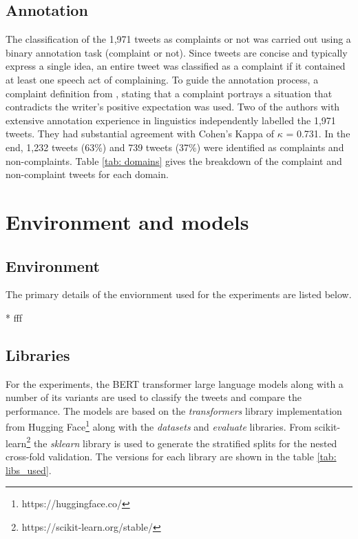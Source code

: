 \subsection{Annotation}
The classification of the 1,971 tweets as complaints or not was carried out using a binary annotation task (complaint or not). Since tweets are concise and typically express a single idea, an entire tweet was classified as a complaint if it contained at least one speech act of complaining. To guide the annotation process, a complaint definition from \cite{olshtain_speechact_1987}, stating that a complaint portrays a situation that contradicts the writer's positive expectation was used. Two of the authors with extensive annotation experience in linguistics independently labelled the 1,971 tweets. They had substantial agreement \cite{artsteinInterCoderAgreementComputational2008} with Cohen's Kappa of $\kappa$ = 0.731. In the end, 1,232 tweets (63\%) and 739 tweets (37\%) were identified as complaints and non-complaints. Table \ref{tab: domains} gives the breakdown of the complaint and non-complaint tweets for each domain.

\section{Environment and models}

\subsection{Environment}
The primary details of the enviornment used for the experiments are listed below. 

* fff

\subsection{Libraries}
For the experiments, the BERT transformer large language models along with a number of its variants are used to classify the tweets and compare the performance. The models are based on the \textit{transformers} library implementation from Hugging Face\footnote{https://huggingface.co/} along with the \textit{datasets} and \textit{evaluate} libraries. From scikit-learn\footnote{https://scikit-learn.org/stable/} the \textit{sklearn} library is used to generate the stratified splits for the nested cross-fold validation. The versions for each library are shown in the table \ref{tab: libs_used}.

